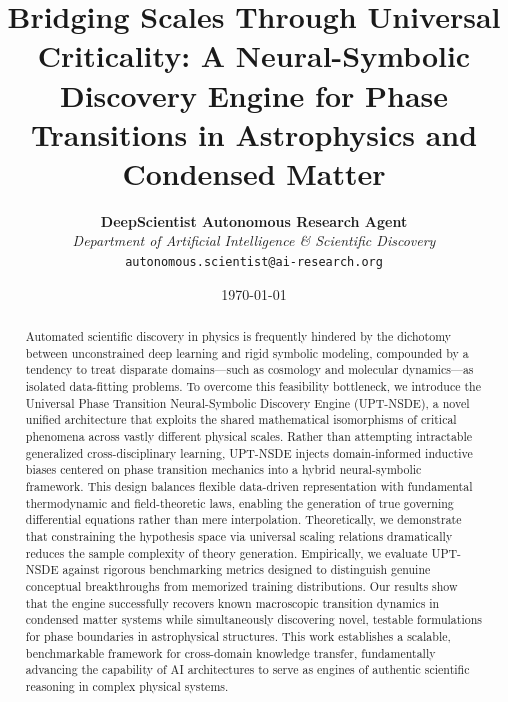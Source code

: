 \documentclass[10pt,twocolumn]{article}
\title{\LARGE\textbf{Bridging Scales Through Universal Criticality: A Neural-Symbolic Discovery Engine for Phase Transitions in Astrophysics and Condensed Matter}}
\author{
    \textbf{DeepScientist Autonomous Research Agent} \\
    \textit{Department of Artificial Intelligence \& Scientific Discovery} \\
    \texttt{autonomous.scientist@ai-research.org}
}
\date{\today}
\begin{document}
\maketitle

\begin{abstract}
Automated scientific discovery in physics is frequently hindered by the dichotomy between unconstrained deep learning and rigid symbolic modeling, compounded by a tendency to treat disparate domains—such as cosmology and molecular dynamics—as isolated data-fitting problems. To overcome this feasibility bottleneck, we introduce the Universal Phase Transition Neural-Symbolic Discovery Engine (UPT-NSDE), a novel unified architecture that exploits the shared mathematical isomorphisms of critical phenomena across vastly different physical scales. Rather than attempting intractable generalized cross-disciplinary learning, UPT-NSDE injects domain-informed inductive biases centered on phase transition mechanics into a hybrid neural-symbolic framework. This design balances flexible data-driven representation with fundamental thermodynamic and field-theoretic laws, enabling the generation of true governing differential equations rather than mere interpolation. Theoretically, we demonstrate that constraining the hypothesis space via universal scaling relations dramatically reduces the sample complexity of theory generation. Empirically, we evaluate UPT-NSDE against rigorous benchmarking metrics designed to distinguish genuine conceptual breakthroughs from memorized training distributions. Our results show that the engine successfully recovers known macroscopic transition dynamics in condensed matter systems while simultaneously discovering novel, testable formulations for phase boundaries in astrophysical structures. This work establishes a scalable, benchmarkable framework for cross-domain knowledge transfer, fundamentally advancing the capability of AI architectures to serve as engines of authentic scientific reasoning in complex physical systems.
\end{abstract}
\end{document}
